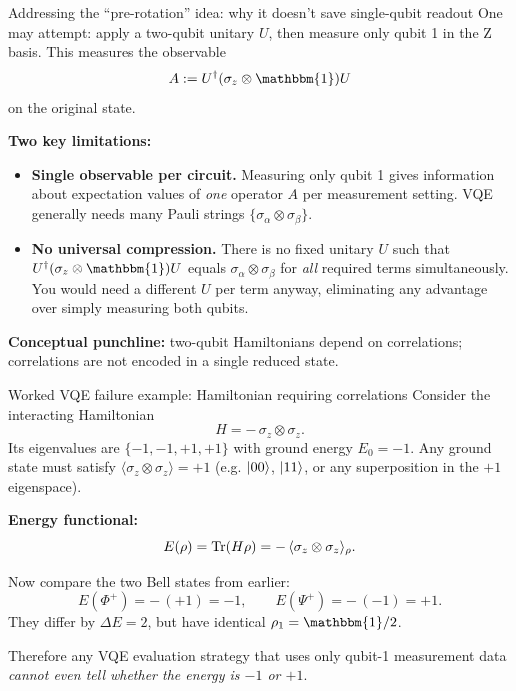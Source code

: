 \documentclass[aspectratio=169]{beamer}
\newcommand{\Z}{\sigma_z}
\newcommand{\I}{\mathbbm{1}}
\begin{document}
\begin{frame}{Addressing the ``pre-rotation'' idea: why it doesn't save single-qubit readout}
One may attempt: apply a two-qubit unitary \(U\), then measure only qubit 1 in the Z basis.
This measures the observable
\[
A := U^\dagger(\Z\otimes\I)U
\]
on the original state.

\medskip
\textbf{Two key limitations:}
\begin{itemize}
\item \textbf{Single observable per circuit.} Measuring only qubit 1 gives information about expectation values of \emph{one} operator \(A\) per measurement setting.
VQE generally needs many Pauli strings \(\{\sigma_\alpha\otimes\sigma_\beta\}\).
\item \textbf{No universal compression.} There is no fixed unitary \(U\) such that
\(U^\dagger(\Z\otimes\I)U\) equals \(\sigma_\alpha\otimes\sigma_\beta\) for \emph{all} required terms simultaneously.
You would need a different \(U\) per term anyway, eliminating any advantage over simply measuring both qubits.
\end{itemize}

\medskip
\textbf{Conceptual punchline:} two-qubit Hamiltonians depend on correlations; correlations are not encoded in a single reduced state.
\end{frame}

\begin{frame}{Worked VQE failure example: Hamiltonian requiring correlations}
Consider the interacting Hamiltonian
\[
H = -\,\Z\otimes\Z.
\]
Its eigenvalues are \(\{-1,-1,+1,+1\}\) with ground energy \(E_0=-1\).
Any ground state must satisfy \(\langle \Z\otimes\Z\rangle=+1\)
(e.g. \(\ket{00}\), \(\ket{11}\), or any superposition in the \(+1\) eigenspace).

\medskip
\textbf{Energy functional:}
\[
E(\rho)=\Tr(H\rho) = -\,\langle \Z\otimes\Z\rangle_\rho.
\]

\medskip
Now compare the two Bell states from earlier:
\[
E(\Phi^+) = -\,(+1)=-1,\qquad E(\Psi^+)=-\,(-1)=+1.
\]
They differ by \(\Delta E=2\), but have identical \(\rho_1=\I/2\).

\medskip
Therefore any VQE evaluation strategy that uses only qubit-1 measurement data \emph{cannot even tell whether the energy is \(-1\) or \(+1\)}.
\end{frame}
\end{document}
